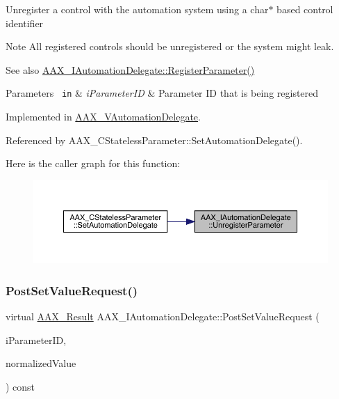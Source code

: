 Unregister a control with the automation system using a char$\ast$ based control identifier

\begin{DoxyNote}{Note}
All registered controls should be unregistered or the system might leak.
\end{DoxyNote}
\begin{DoxySeeAlso}{See also}
\mbox{\hyperlink{a01773_a4d91efb2d922729d02e2ea7d7a05ed10}{A\+A\+X\+\_\+\+I\+Automation\+Delegate\+::\+Register\+Parameter()}}
\end{DoxySeeAlso}

\begin{DoxyParams}[1]{Parameters}
\mbox{\texttt{ in}}  & {\em i\+Parameter\+ID} & Parameter ID that is being registered \\
\hline
\end{DoxyParams}


Implemented in \mbox{\hyperlink{a01893_a35eeea2ece121cca53b285070722899c}{A\+A\+X\+\_\+\+V\+Automation\+Delegate}}.



Referenced by A\+A\+X\+\_\+\+C\+Stateless\+Parameter\+::\+Set\+Automation\+Delegate().

Here is the caller graph for this function\+:
\nopagebreak
\begin{figure}[H]
\begin{center}
\leavevmode
\includegraphics[width=350pt]{a01773_ab1c1d4292460119b22d68247150cc1a0_icgraph}
\end{center}
\end{figure}
\mbox{\label{a01773_a9d0e2c5d57d177a4dca0ff10cde0256c}} 
\subsubsection{\texorpdfstring{PostSetValueRequest()}{PostSetValueRequest()}}
{\footnotesize\ttfamily virtual \mbox{\hyperlink{a00392_a4d8f69a697df7f70c3a8e9b8ee130d2f}{A\+A\+X\+\_\+\+Result}} A\+A\+X\+\_\+\+I\+Automation\+Delegate\+::\+Post\+Set\+Value\+Request (\begin{DoxyParamCaption}\item[{\mbox{\hyperlink{a00392_a1440c756fe5cb158b78193b2fc1780d1}{A\+A\+X\+\_\+\+C\+Param\+ID}}}]{i\+Parameter\+ID,  }\item[{double}]{normalized\+Value }\end{DoxyParamCaption}) const\hspace{0.3cm}{\ttfamily [pure virtual]}}

